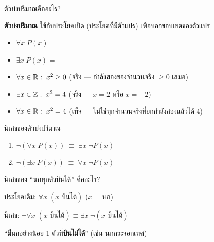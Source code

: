 \documentclass[11pt, aspectratio=169]{beamer}
\begin{document}
\begin{frame}{ตัวบ่งปริมาณคืออะไร?}
  \begin{explanation}[นิยาม]
    \textbf{ตัวบ่งปริมาณ} ใช้กับประโยคเปิด (ประโยคที่มีตัวแปร) เพื่อบอกขอบเขตของตัวแปร

    \medskip
    \begin{itemize}
      \item $\forall x\; P(x)$ = 
      \item $\exists x\; P(x)$ = 
    \end{itemize}
  \end{explanation}

  \begin{exambox}[ตัวอย่าง]
    \begin{itemize}
      \item $\forall x \in \mathbb{R}:\; x^2 \geq 0$ \quad (จริง — กำลังสองของจำนวนจริง $\geq 0$ เสมอ)
      \item $\exists x \in \mathbb{Z}:\; x^2 = 4$ \quad (จริง — $x = 2$ หรือ $x = -2$)
      \item $\forall x \in \mathbb{R}:\; x^2 = 4$ \quad (เท็จ — ไม่ใช่ทุกจำนวนจริงที่ยกกำลังสองแล้วได้ 4)
    \end{itemize}
  \end{exambox}
\end{frame}

\begin{frame}{นิเสธของตัวบ่งปริมาณ}
  \begin{explanation}
    \begin{enumerate}
      \item $\lnot (\forall x\; P(x)) \;\equiv\; \exists x\; \lnot P(x)$
      \item $\lnot (\exists x\; P(x)) \;\equiv\; \forall x\; \lnot P(x)$
    \end{enumerate}
  \end{explanation}

  \begin{exambox}[ตัวอย่าง]
    นิเสธของ ``นกทุกตัวบินได้'' คืออะไร?

    \medskip
    ประโยคเดิม: $\forall x\; (x \text{ บินได้})$ \quad ($x$ = นก)

    นิเสธ: $\lnot \forall x\; (x \text{ บินได้}) \equiv \exists x\; \lnot(x \text{ บินได้})$

    \medskip
    ``\textbf{มี}นกอย่างน้อย 1 ตัวที่\textbf{บินไม่ได้}'' \quad (เช่น นกกระจอกเทศ)
  \end{exambox}
\end{frame}
\end{document}
